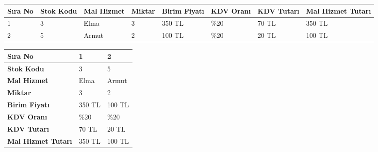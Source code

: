\noindent\begin{tabularx}{\textwidth}{|p{1cm}|X|X|p{1.5cm}|X|p{2cm}|X|X|}\hline 
 \textbf{Sıra No} & \textbf{Stok Kodu} & \textbf{Mal Hizmet} & \textbf{Miktar} & \textbf{Birim Fiyatı} & \textbf{KDV Oranı} & \textbf{KDV Tutarı} & \textbf{Mal Hizmet Tutarı}\\ \hline
 1 & 3 & Elma & 3 & 350 TL & \%20 & 70 TL & 350 TL \\ \hline
 2 & 5 & Armut & 2 & 100 TL & \%20 & 20 TL & 100 TL \\ \hline
 \end{tabularx}
\begin{minipage}[t]{0.48\textwidth}\end{minipage}\hfill\noindent\begin{minipage}[t]{0.48\textwidth}\begin{tabularx}{\textwidth}{|l|X|X|}\hline 
\textbf{Sıra No} & 1 & 2 \\ \hline 
\textbf{Stok Kodu} & 3 & 5 \\ \hline 
\textbf{Mal Hizmet} & Elma & Armut \\ \hline 
\textbf{Miktar} & 3 & 2 \\ \hline 
\textbf{Birim Fiyatı} & 350 TL & 100 TL \\ \hline 
\textbf{KDV Oranı} & \%20 & \%20 \\ \hline 
\textbf{KDV Tutarı} & 70 TL & 20 TL \\ \hline 
\textbf{Mal Hizmet Tutarı} & 350 TL & 100 TL \\ \hline 
\end{tabularx}
\end{minipage}
